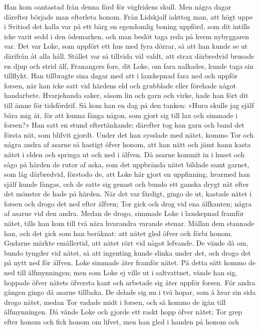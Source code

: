Han kom oantastad från denna färd för vägfridens skull. Men några dagar
därefter började man efterleta honom. Från Lidskjalf iakttog man, att
högt uppe i Svitiod det kalla var på ett bärg en egendomlig boning
uppförd, som dit intills icke varit sedd i den ödemarken, och man beslöt
taga reda på hvem nybyggaren var. Det var Loke, som uppfört ett hus med
fyra dörrar, så att han kunde se ut därifrån åt alla håll. Stället var
så tillvida väl valdt, att strax därbredvid brusade en djup och strid
älf, Franangers fors, dit Loke, om fara nalkades, kunde taga sin
tillflykt. Han tillbragte sina dagar med att i laxskepnad fara ned och
uppför forsen, när han icke satt vid härdens eld och grubblade eller
förehade något handarbete. Hvarjehanda saker, såsom lin och garn och
virke, hade han fört dit till ämne för tidsfördrif. Så kom han en dag på
den tanken: »Huru skulle jag själf bära mig åt, för att kunna fånga
någon, som gjort sig till lax och simmade i forsen?» Han satt en stund
eftertänkande; därefter tog han garn och band det första nät, som
blifvit gjordt. Under det han sysslade med nätet, kommo Tor och några
andra af asarne så hastigt öfver honom, att han nätt och jämt hann kasta
nätet i elden och springa ut och ned i älfven. Då asarne kommit in i
huset och sågo på härden de rutor af aska, som det uppbrända nätet
bildade samt garnet, som låg därbredvid, förstodo de, att Loke här gjort
en uppfinning, hvarmed han själf kunde fångas, och de satte sig genast
och bundo ett ganska drygt nät efter det mönster de hade på härden. När
det var färdigt, gingo de ut, kastade nätet i forsen och drogo det ned
efter älfven; Tor gick och drog vid ena älfkanten; några af asarne vid
den andra. Medan de drogo, simmade Loke i laxskepnad framför nätet,
tills han
kom till två nära hvarandra varande stenar. Mällan dem stannade han, och
det gick som han beräknat: att nätet gled öfver och förbi honom. Gudarne
märkte emällertid, att nätet rört vid något lefvande. De vände då om,
bundo tyngder vid nätet, så att ingenting kunde slinka under det, och
drogo det på nytt ned för älfven. Loke simmade åter framför nätet. På
detta sätt kommo de ned till älfmynningen; men som Loke ej ville ut i
saltvattnet, vände han sig, hoppade öfver nätets öfversta kant och
arbetade sig åter uppför forsen. För andra gången gingo då asarne
tillbaka. De delade sig nu i två hopar, som å hvar sin sida drogo nätet,
medan Tor vadade midt i forsen, och så kommo de igän till älfmynningen.
Då vände Loke och gjorde ett raskt hopp öfver nätet; Tor grep efter
honom och fick honom om lifvet, men han gled i handen på honom och
